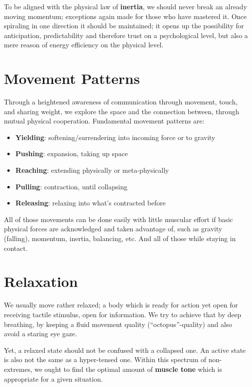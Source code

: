 To be aligned with the physical law of \textbf{inertia}, we should never break an already moving momentum; exceptions again made for those who have mastered it.
Once spiraling in one direction it should be maintained; it opens up the possibility for anticipation, predictability and therefore trust on a psychological level, but also a mere reason of energy efficiency on the physical level.

\section{Movement Patterns}\label{sec:movement-patterns}

Through a heightened awareness of communication through movement, touch, and sharing weight, we explore the space and the connection between, through mutual physical cooperation.
Fundamental movement patterns are:

\begin{itemize}
    \item [] \textbf{Yielding}: softening/surrendering into incoming force or to gravity
    \item [] \textbf{Pushing}: expansion, taking up space
    \item [] \textbf{Reaching}: extending physically or meta-physically
    \item [] \textbf{Pulling}: contraction, until collapsing
    \item [] \textbf{Releasing}: relaxing into what's contracted before
\end{itemize}

All of those movements can be done easily with little muscular effort if basic physical forces are acknowledged and taken advantage of, such as gravity (falling), momentum, inertia, balancing, etc.
And all of those while staying in contact.

\section{Relaxation}\label{sec:relaxation}

We usually move rather relaxed; a body which is ready for action yet open for receiving tactile stimulus, open for information.
We try to achieve that by deep breathing, by keeping a fluid movement quality (``octopus''-quality) and also avoid a staring eye gaze.

Yet, a relaxed state should not be confused with a collapsed one.
An active state is also not the same as a hyper-tensed one.
Within this spectrum of non-extremes, we ought to find the optimal amount of \textbf{muscle tone} which is appropriate for a given situation.
